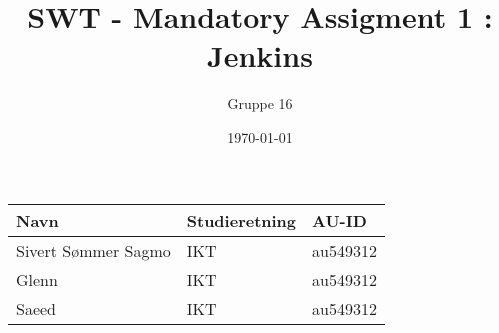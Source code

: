 \documentclass{article}
\title{SWT - Mandatory Assigment 1 : Jenkins}
\author{Gruppe 16}
\date{\today}
\begin{document}
\maketitle

\begin{table}[H]
\centering
\begin{tabular}{|l|l|l|}
\hline
\textbf{Navn}       & \textbf{Studieretning} & \textbf{AU-ID} \\ \hline
Sivert Sømmer Sagmo & IKT                    & au549312             \\ \hline
Glenn & IKT                    & au549312             \\ \hline
Saeed & IKT                    & au549312             \\ \hline
\end{tabular}
\end{table}

\tableofcontents
\pagebreak











%
%
\end{document}

